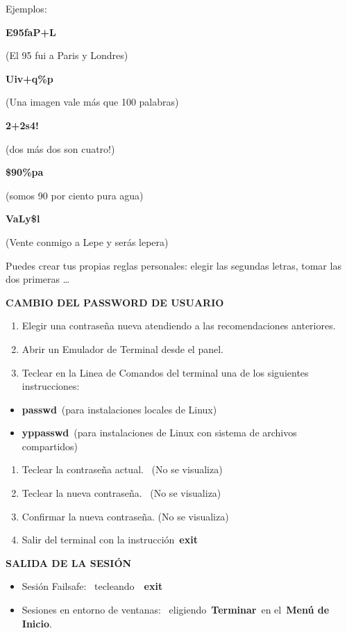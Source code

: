 \documentclass[
  jou,
  floatsintext,
  longtable,
  a4paper,
  nolmodern,
  notxfonts,
  notimes,
  12pt,
  colorlinks=true,linkcolor=blue,citecolor=blue,urlcolor=blue]{apa7}
\providecommand{\tightlist}{%
  \setlength{\itemsep}{0pt}\setlength{\parskip}{0pt}}
\begin{document}
Ejemplos:

\textbf{E95faP+L}

(El 95 fui a Paris y Londres)

\textbf{Uiv+q\%p}

(Una imagen vale más que 100 palabras)

\textbf{2+2s4!}

(dos más dos son cuatro!)

\textbf{\$90\%pa}

(somos 90 por ciento pura agua)

\textbf{VaLy\$l}

(Vente conmigo a Lepe y serás lepera)

Puedes crear tus propias reglas personales: elegir las segundas letras,
tomar las dos primeras \ldots{}

\textbf{CAMBIO DEL PASSWORD DE USUARIO}

\begin{enumerate}
\def\labelenumi{\arabic{enumi}.}
\tightlist
\item
  Elegir una contraseña nueva atendiendo a las recomendaciones
  anteriores.
\item
  Abrir un Emulador de Terminal desde el panel.
\item
  Teclear en la Linea de Comandos del terminal una de los siguientes
  instrucciones:
\end{enumerate}

\begin{itemize}
\tightlist
\item
  \textbf{passwd}~(para instalaciones locales de Linux)
\item
  \textbf{yppasswd}~(para instalaciones de Linux con sistema de archivos
  compartidos)
\end{itemize}

\begin{enumerate}
\def\labelenumi{\arabic{enumi}.}
\setcounter{enumi}{4}
\tightlist
\item
  Teclear la contraseña actual.~ (No se visualiza)
\item
  Teclear la nueva contraseña.~ (No se visualiza)
\item
  Confirmar la nueva contraseña. (No se visualiza)
\item
  Salir del terminal con la instrucción~\textbf{exit}
\end{enumerate}

\textbf{SALIDA DE LA SESIÓN}

\begin{itemize}
\tightlist
\item
  Sesión Failsafe:~ tecleando~~\textbf{exit}
\item
  Sesiones en entorno de ventanas:~ eligiendo~\textbf{Terminar}~en
  el~\textbf{Menú de Inicio}.
\end{itemize}
\end{document}
